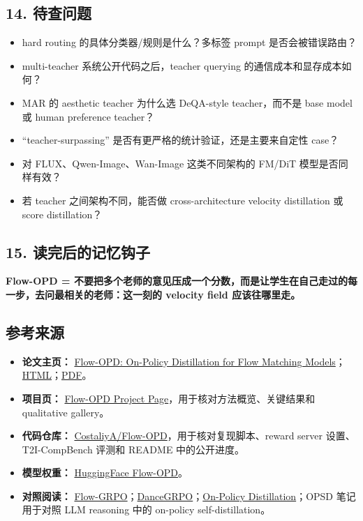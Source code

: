 \subsection{14. 待查问题}

\begin{itemize}[leftmargin=1.5em]
  \item hard routing 的具体分类器/规则是什么？多标签 prompt 是否会被错误路由？
  \item multi-teacher 系统公开代码之后，teacher querying 的通信成本和显存成本如何？
  \item MAR 的 aesthetic teacher 为什么选 DeQA-style teacher，而不是 base model 或 human preference teacher？
  \item ``teacher-surpassing'' 是否有更严格的统计验证，还是主要来自定性 case？
  \item 对 FLUX、Qwen-Image、Wan-Image 这类不同架构的 FM/DiT 模型是否同样有效？
  \item 若 teacher 之间架构不同，能否做 cross-architecture velocity distillation 或 score distillation？
\end{itemize}

\subsection{15. 读完后的记忆钩子}

\begin{intubox}
\textbf{Flow-OPD = 不要把多个老师的意见压成一个分数，而是让学生在自己走过的每一步，去问最相关的老师：这一刻的 velocity field 应该往哪里走。}
\end{intubox}

\subsection{参考来源}

\begin{itemize}[leftmargin=1.5em]
  \item \textbf{论文主页：} \href{https://arxiv.org/abs/2605.08063}{Flow-OPD: On-Policy Distillation for Flow Matching Models}；\href{https://arxiv.org/html/2605.08063v2}{HTML}；\href{https://arxiv.org/pdf/2605.08063}{PDF}。
  \item \textbf{项目页：} \href{https://costaliya.github.io/Flow-OPD/}{Flow-OPD Project Page}，用于核对方法概览、关键结果和 qualitative gallery。
  \item \textbf{代码仓库：} \href{https://github.com/CostaliyA/Flow-OPD}{CostaliyA/Flow-OPD}，用于核对复现脚本、reward server 设置、T2I-CompBench 评测和 README 中的公开进度。
  \item \textbf{模型权重：} \href{https://huggingface.co/CostaliyA/Flow-OPD}{HuggingFace Flow-OPD}。
  \item \textbf{对照阅读：} \href{https://arxiv.org/abs/2505.05470}{Flow-GRPO}；\href{https://arxiv.org/abs/2505.07818}{DanceGRPO}；\href{https://thinkingmachines.ai/blog/on-policy-distillation}{On-Policy Distillation}；OPSD 笔记用于对照 LLM reasoning 中的 on-policy self-distillation。
\end{itemize}
